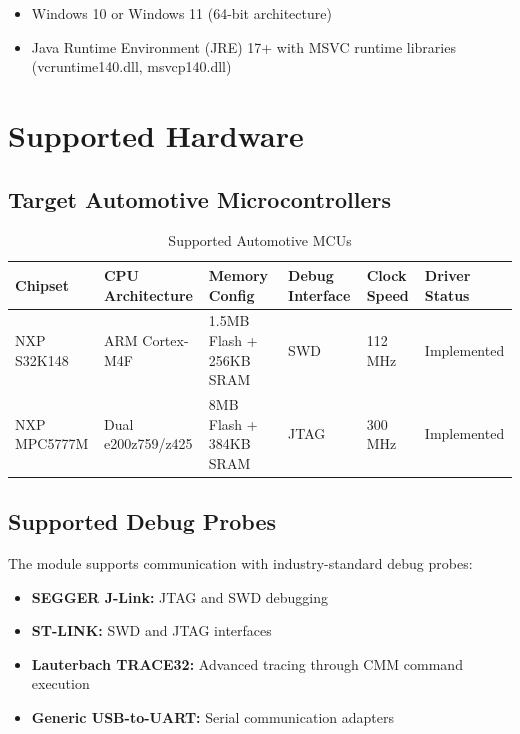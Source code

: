 \documentclass[12pt,a4paper]{article}
\begin{document}
\begin{itemize}
    \item Windows 10 or Windows 11 (64-bit architecture)
    \item Java Runtime Environment (JRE) 17+ with MSVC runtime libraries (vcruntime140.dll, msvcp140.dll)
\end{itemize}

\newpage

\section{Supported Hardware}

\subsection{Target Automotive Microcontrollers}

\begin{table}[h]
\centering
\small
\begin{tabular}{|p{2.5cm}|p{2cm}|p{2.5cm}|p{2.5cm}|p{2cm}|p{1.2cm}|}
\hline
\textbf{Chipset} & \textbf{CPU Architecture} & \textbf{Memory Config} & \textbf{Debug Interface} & \textbf{Clock Speed} & \textbf{Driver Status} \\
\hline
NXP S32K148 & ARM Cortex-M4F & 1.5MB Flash + 256KB SRAM & SWD & 112 MHz & Implemented \\
\hline
NXP MPC5777M & Dual e200z759/z425 & 8MB Flash + 384KB SRAM & JTAG & 300 MHz & Implemented \\
\hline
\end{tabular}
\caption{Supported Automotive MCUs}
\end{table}

\subsection{Supported Debug Probes}

The module supports communication with industry-standard debug probes:

\begin{itemize}
    \item \textbf{SEGGER J-Link:} JTAG and SWD debugging
    \item \textbf{ST-LINK:} SWD and JTAG interfaces
    \item \textbf{Lauterbach TRACE32:} Advanced tracing through CMM command execution
    \item \textbf{Generic USB-to-UART:} Serial communication adapters
\end{itemize}
\end{document}
